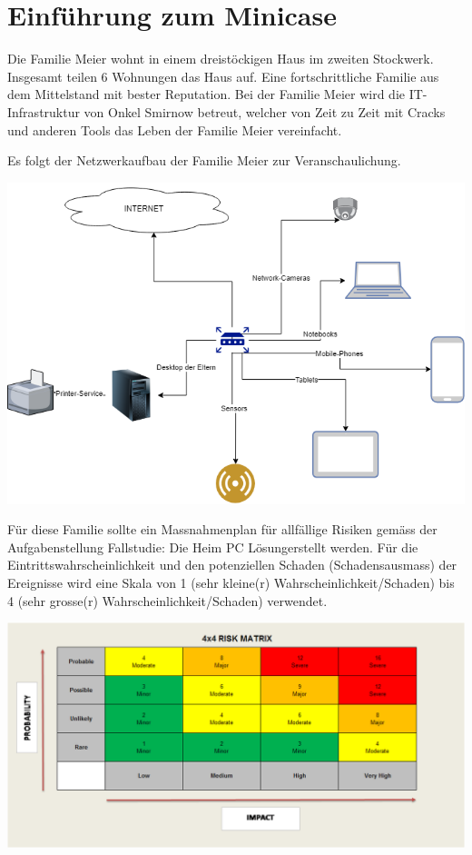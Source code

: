 \section{Einführung zum Minicase}

Die Familie Meier wohnt in einem dreistöckigen Haus im zweiten Stockwerk. Insgesamt teilen 6 Wohnungen das Haus auf. Eine fortschrittliche Familie aus dem Mittelstand mit bester Reputation.
Bei der Familie Meier wird die IT-Infrastruktur von Onkel Smirnow betreut, welcher von Zeit zu Zeit mit Cracks und anderen Tools das Leben der Familie Meier vereinfacht.


Es folgt der Netzwerkaufbau der Familie Meier zur Veranschaulichung.


\includegraphics[width=14cm]{Netzwerk}

Für diese Familie sollte ein Massnahmenplan für allfällige Risiken gemäss der Aufgabenstellung \grqq Fallstudie: Die Heim PC Lösung\grqq \space erstellt werden. Für die Eintrittswahrscheinlichkeit und den potenziellen Schaden (Schadensausmass) der Ereignisse wird eine Skala von 1 (sehr kleine(r) Wahrscheinlichkeit/Schaden) bis 4 (sehr grosse(r) Wahrscheinlichkeit/Schaden) verwendet.



\includegraphics[width=\textwidth]{Risikomatrix}
